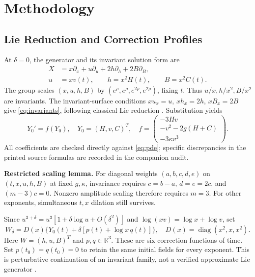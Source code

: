 \documentclass[12pt,a4paper]{article}
\newcommand{\R}{\mathbb R}
\newcommand{\diag}{\operatorname{diag}}
\begin{document}
\newpage
\section{Methodology}
\subsection{Lie Reduction and Correction Profiles}
At $\delta=0$, the generator and its invariant solution form are
\begin{equation}
\begin{aligned}
X&=x\partial_x+u\partial_u+2h\partial_h+2B\partial_B,\\
u&=xv(t),\qquad h=x^2H(t),\qquad B=x^2C(t).
\end{aligned}\label{eq:invariants}
\end{equation}
The group scales $(x,u,h,B)$ by $(e^\rho,e^\rho,e^{2\rho},e^{2\rho})$, fixing $t$. Thus $u/x,h/x^2,B/x^2$ are invariants. The invariant-surface conditions $xu_x=u$, $xh_x=2h$, $xB_x=2B$ give \eqref{eq:invariants}, following classical Lie reduction \cite{olver}. Substitution yields
\begin{equation}
Y_0'=f(Y_0),\quad Y_0=(H,v,C)^T,\quad
f=\begin{pmatrix}-3Hv\\-v^2-2g(H+C)\\-3\kappa v^3\end{pmatrix}.
\label{eq:base}
\end{equation}
All coefficients are checked directly against \eqref{eq:pde}; specific discrepancies in the printed source formulas are recorded in the companion audit.

\textbf{Restricted scaling lemma.} For diagonal weights $(a,b,c,d,e)$ on $(t,x,u,h,B)$ at fixed $g,\kappa$, invariance requires $c=b-a$, $d=e=2c$, and $(m-3)c=0$. Nonzero amplitude scaling therefore requires $m=3$. For other exponents, simultaneous $t,x$ dilation still survives.

Since $u^{3+\delta}=u^3[1+\delta\log u+O(\delta^2)]$ and $\log(xv)=\log x+\log v$, set
\begin{equation}
W_\delta=D(x)\{Y_0(t)+\delta[p(t)+\log x\,q(t)]\},\quad
D(x)=\diag(x^2,x,x^2).
\label{eq:ansatz}
\end{equation}
Here $W=(h,u,B)^T$ and $p,q\in\R^3$. These are six correction functions of time. Set $p(t_0)=q(t_0)=0$ to retain the same initial fields for every exponent. This is perturbative continuation of an invariant family, not a verified approximate Lie generator \cite{disalvo}.
\end{document}
